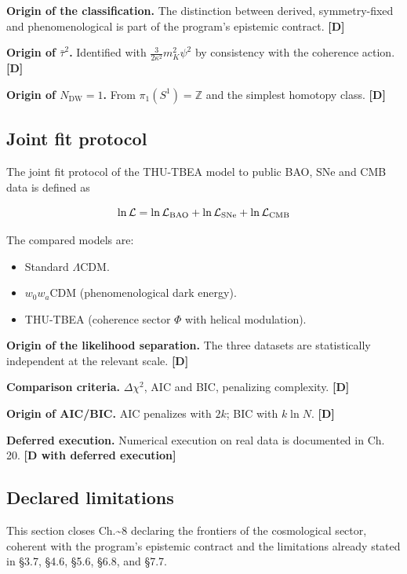﻿\documentclass[11pt,letterpaper]{article}
\begin{document}
\textbf{Origin of the classification.} The distinction between derived, symmetry-fixed and phenomenological is part of the program's epistemic contract. \textbf{[D]}

\textbf{Origin of $\bar\tau^2$.} Identified with $\frac{3}{2\kappa^2}m_K^2\psi^2$ by consistency with the coherence action. \textbf{[D]}

\textbf{Origin of $N_{\text{DW}} = 1$.} From $\pi_1(S^1) = \mathbb{Z}$ and the simplest homotopy class. \textbf{[D]}
\subsection{Joint fit protocol}
The joint fit protocol of the THU-TBEA model to public BAO, SNe and CMB data is defined as

\begin{equation*}
  \resizebox{\ifdim\width>\linewidth \linewidth\else\width\fi}{!}{$\displaystyle \ln\mathcal{L} = \ln\mathcal{L}_{\text{BAO}} + \ln\mathcal{L}_{\text{SNe}} + \ln\mathcal{L}_{\text{CMB}}$}
\end{equation*}

The compared models are:

\begin{itemize}[leftmargin=*]
\item Standard $\Lambda$CDM.
\item $w_0w_a$CDM (phenomenological dark energy).
\item THU-TBEA (coherence sector $\Phi$ with helical modulation).
\end{itemize}

\textbf{Origin of the likelihood separation.} The three datasets are statistically independent at the relevant scale. \textbf{[D]}

\textbf{Comparison criteria.} $\Delta\chi^2$, AIC and BIC, penalizing complexity. \textbf{[D]}

\textbf{Origin of AIC/BIC.} AIC penalizes with $2k$; BIC with $k\ln N$. \textbf{[D]}

\textbf{Deferred execution.} Numerical execution on real data is documented in Ch. 20. \textbf{[D with deferred execution]}
\subsection{Declared limitations}
This section closes Ch.\textasciitilde{}8 declaring the frontiers of the cosmological sector, coherent with the program's epistemic contract and the limitations already stated in §3.7, §4.6, §5.6, §6.8, and §7.7.
\end{document}
